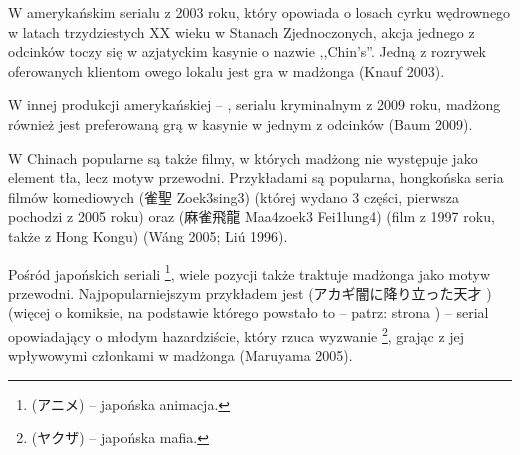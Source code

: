 W amerykańskim serialu  z 2003 roku, który
opowiada o losach cyrku wędrownego w latach trzydziestych XX wieku w Stanach
Zjednoczonych, akcja jednego z odcinków toczy się w azjatyckim kasynie o
nazwie ,,Chin's''. Jedną z rozrywek oferowanych klientom owego lokalu jest gra w
madżonga (Knauf 2003).

W innej produkcji amerykańskiej -- , serialu kryminalnym z 2009
roku, madżong również jest preferowaną grą w kasynie w jednym z odcinków (Baum
2009).

W Chinach popularne są także filmy, w których madżong nie
występuje jako element tła, lecz motyw przewodni. Przykładami są popularna,
hongkońska seria filmów komediowych  (雀聖 Zoek3sing3)
(której wydano 3 części, pierwsza pochodzi z 2005 roku) oraz  (麻雀飛龍 Maa4zoek3 Fei1lung4) (film z 1997 roku, także z Hong Kongu)
(Wáng 2005; Liú 1996).

Pośród japońskich seriali \footnote{ (アニメ) --
japońska animacja.}, wiele pozycji także traktuje madżonga jako motyw przewodni.
Najpopularniejszym przykładem jest  (アカギ闇に降り立った天才   
 ) (więcej o komiksie, na podstawie którego
powstało to  -- patrz: strona \pageref{washizu}) -- serial
opowiadający o młodym hazardziście, który rzuca wyzwanie
\footnote{ (ヤクザ) -- japońska mafia.}, grając z
jej wpływowymi członkami w madżonga (Maruyama 2005).










 














